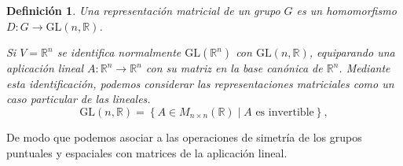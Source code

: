 \documentclass{report}
\newtheorem{definition}{Definición}
\begin{document}
\begin{definition}
Una representación matricial de un grupo \( G \) es un \textit{homomorfismo} \( D : G \to \text{GL}(n, \mathbb{R}) \).

\medskip

Si \( V = \mathbb{R}^n \) se identifica normalmente \( \text{GL}(\mathbb{R}^n) \) con \( \text{GL}(n, \mathbb{R}) \), equiparando una aplicación lineal \( A : \mathbb{R}^n \to \mathbb{R}^n \) con su matriz en la base canónica de \( \mathbb{R}^n \). Mediante esta identificación, podemos considerar las representaciones matriciales como un caso particular de las lineales.\\

\[
\text{GL}(n, \mathbb{R}) = \left\{ A \in M_{n\times n}(\mathbb{R}) \mid A \text{ es invertible} \right\},
\]

\end{definition}

De modo que podemos asociar a las operaciones de simetría de los grupos puntuales y espaciales con matrices de la aplicación lineal.




\vspace{.4cm}
\end{document}
